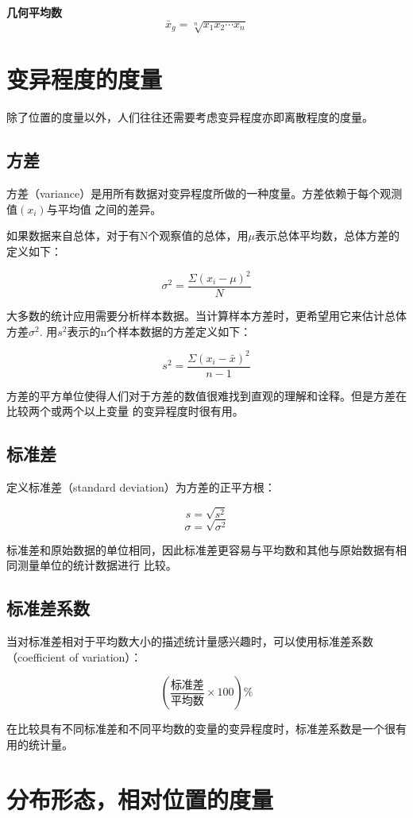 \documentclass[a4paper]{ctexrep}
\begin{document}
\textbf{几何平均数}
\[\bar{x}_{g} = \sqrt[n]{x_{1}x_{2}\cdots x_{n}}\]


\section{变异程度的度量}
除了位置的度量以外，人们往往还需要考虑变异程度亦即离散程度的度量。

\subsection{方差}
方差（variance）是用所有数据对变异程度所做的一种度量。方差依赖于每个观测值$(x_{i})$与平均值
之间的差异。

如果数据来自总体，对于有N个观察值的总体，用$\mu$表示总体平均数，总体方差的定义如下：

\[\sigma^{2}=\frac{\Sigma(x_{i}-\mu)^{2}}{N}\]

大多数的统计应用需要分析样本数据。当计算样本方差时，更希望用它来估计总体方差$\sigma^{2}$.
用$s^{2}$表示的n个样本数据的方差定义如下：

\[s^{2} = \frac{\Sigma(x_{i} - \bar{x})^{2}}{n - 1}\]

方差的平方单位使得人们对于方差的数值很难找到直观的理解和诠释。但是方差在比较两个或两个以上变量
的变异程度时很有用。

\subsection{标准差}
定义标准差（standard deviation）为方差的正平方根：

\[s = \sqrt{s^{2}}\]
\[\sigma = \sqrt{\sigma^{2}}\]

标准差和原始数据的单位相同，因此标准差更容易与平均数和其他与原始数据有相同测量单位的统计数据进行
比较。

\subsection{标准差系数}
当对标准差相对于平均数大小的描述统计量感兴趣时，可以使用标准差系数（coefficient of variation）：

\[(\frac{\mbox{标准差}}{\mbox{平均数}}\times 100)\%\]

在比较具有不同标准差和不同平均数的变量的变异程度时，标准差系数是一个很有用的统计量。


\section{分布形态，相对位置的度量}
\end{document}
